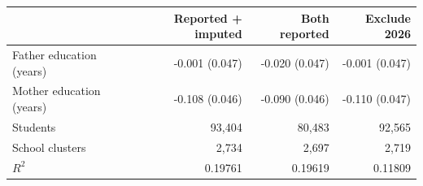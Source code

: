 \begin{tabular}{lrrr}
\hline
 & Reported + imputed & Both reported & Exclude 2026 \\
\hline
Father education (years) & -0.001 (0.047) & -0.020 (0.047) & -0.001 (0.047) \\
Mother education (years) & -0.108 (0.046) & -0.090 (0.046) & -0.110 (0.047) \\
Students & 93,404 & 80,483 & 92,565 \\
School clusters & 2,734 & 2,697 & 2,719 \\
$R^2$ & 0.19761 & 0.19619 & 0.11809 \\
\hline
\end{tabular}
